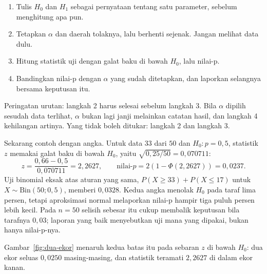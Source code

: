 \begin{resep}
\begin{enumerate}
  \item Tulis $H_0$ dan $H_1$ sebagai pernyataan tentang satu parameter, sebelum
        menghitung apa pun.
  \item Tetapkan $\alpha$ dan daerah tolaknya, lalu berhenti sejenak. Jangan melihat
        data dulu.
  \item Hitung statistik uji dengan galat baku di bawah $H_0$, lalu nilai-p.
  \item Bandingkan nilai-p dengan $\alpha$ yang sudah ditetapkan, dan laporkan
        selangnya bersama keputusan itu.
\end{enumerate}
Peringatan urutan: langkah 2 harus selesai sebelum langkah 3. Bila $\alpha$ dipilih
sesudah data terlihat, $\alpha$ bukan lagi janji melainkan catatan hasil, dan langkah 4
kehilangan artinya. Yang tidak boleh ditukar: langkah 2 dan langkah 3.
\end{resep}

Sekarang contoh dengan angka. Untuk data $33$ dari $50$ dan $H_0\colon p=0{,}5$,
statistik $z$ memakai galat baku di bawah $H_0$, yaitu $\sqrt{0{,}25/50}=0{,}070711$:
\[
z=\frac{0{,}66-0{,}5}{0{,}070711}=2{,}2627,\qquad
\text{nilai-}p=2(1-\Phi(2{,}2627))=0{,}0237 .
\]
Uji binomial eksak atas aturan yang sama, $P(X\ge33)+P(X\le17)$ untuk
$X\sim\mathrm{Bin}(50;0{,}5)$, memberi $0{,}0328$. Kedua angka menolak $H_0$ pada
taraf lima persen, tetapi aproksimasi normal melaporkan nilai-p hampir tiga puluh
persen lebih kecil. Pada $n=50$ selisih sebesar itu cukup membalik keputusan bila
tarafnya $0{,}03$; laporan yang baik menyebutkan uji mana yang dipakai, bukan hanya
nilai-p-nya.

Gambar~\ref{fig:dua-ekor} menaruh kedua batas itu pada sebaran $z$ di bawah $H_0$: dua
ekor seluas $0{,}0250$ masing-masing, dan statistik teramati $2{,}2627$ di dalam ekor
kanan.

